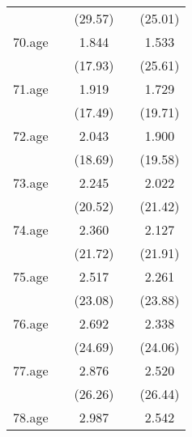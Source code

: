 {\begin{tabular}{l*{4}{c}}
            &                     &     (29.57)         &                     &     (25.01)         \\
[1em]
70.age      &                     &       1.844\sym{***}&                     &       1.533\sym{***}\\
            &                     &     (17.93)         &                     &     (25.61)         \\
[1em]
71.age      &                     &       1.919\sym{***}&                     &       1.729\sym{***}\\
            &                     &     (17.49)         &                     &     (19.71)         \\
[1em]
72.age      &                     &       2.043\sym{***}&                     &       1.900\sym{***}\\
            &                     &     (18.69)         &                     &     (19.58)         \\
[1em]
73.age      &                     &       2.245\sym{***}&                     &       2.022\sym{***}\\
            &                     &     (20.52)         &                     &     (21.42)         \\
[1em]
74.age      &                     &       2.360\sym{***}&                     &       2.127\sym{***}\\
            &                     &     (21.72)         &                     &     (21.91)         \\
[1em]
75.age      &                     &       2.517\sym{***}&                     &       2.261\sym{***}\\
            &                     &     (23.08)         &                     &     (23.88)         \\
[1em]
76.age      &                     &       2.692\sym{***}&                     &       2.338\sym{***}\\
            &                     &     (24.69)         &                     &     (24.06)         \\
[1em]
77.age      &                     &       2.876\sym{***}&                     &       2.520\sym{***}\\
            &                     &     (26.26)         &                     &     (26.44)         \\
[1em]
78.age      &                     &       2.987\sym{***}&                     &       2.542\sym{***}\\

\end{tabular}}
